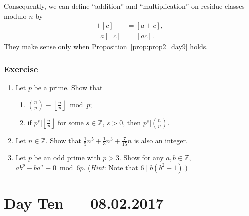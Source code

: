 \documentclass{amsbook}
\theoremstyle{plain}
\theoremstyle{definition}
\theoremstyle{remark}
\numberwithin{equation}{chapter}
\numberwithin{figure}{chapter}
\newcommand*{\bigmid}{\mathrel{\bigg|}}
\newcommand{\Z}{\mathbb{Z}}
\begin{document}
Consequently, we can define ``addition'' and ``multiplication'' on residue classes modulo $n$ by
\begin{align}
  [a] + [c] &= [a + c], \\
  [a][c]    &= [ac].
\end{align}
They make sense only when Proposition~\ref{prop:prop2_day9} holds.

\subsection*{Exercise}
\begin{enumerate}
\item Let $p$ be a prime. Show that
  \begin{enumerate}
  \item $\displaystyle \binom{n}{p} \equiv \left\lfloor \frac{n}p \right\rfloor \bmod p$;
  \item if $\displaystyle p^s \bigmid \left\lfloor \frac{n}p \right\rfloor$ for some $s \in \Z$, $s > 0$, then $\displaystyle p^s \bigmid \binom{n}p$.
  \end{enumerate}
\item Let $n \in \Z$. Show that $\frac{1}5 n^5 + \frac{1}3 n^3 + \frac{7}{15} n$ is also an integer.
\item Let $p$ be an odd prime with $p > 3$. Show for any $a, b \in \Z$, $a b^p - b a^a \equiv 0 \bmod 6p$. (\emph{Hint}: Note that $6 \mid b(b^2 - 1)$.)
\end{enumerate}
\chapter[Lecture Ten]{Day Ten \hfill {\footnotesize \rm --- 08.02.2017}}
\end{document}
